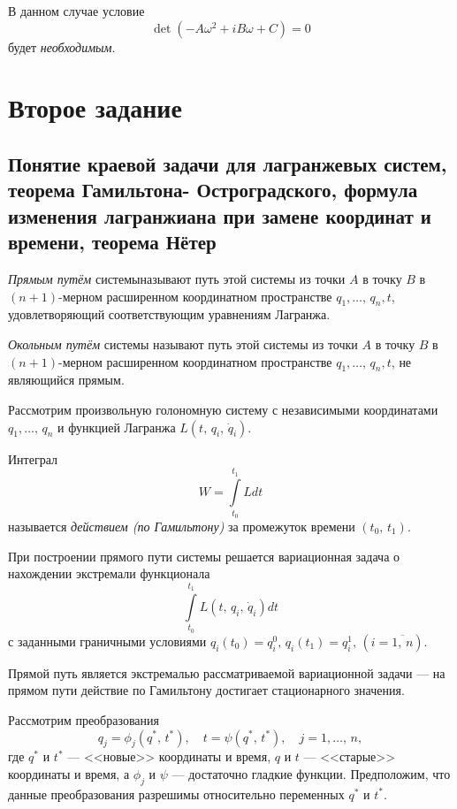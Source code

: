 \documentclass[a4paper]{article}
\begin{document}
В данном случае условие
\[
	\det (-A \omega^2 +i B\omega+C)=0
\] 
будет  \emph{необходимым}.
\section{Второе задание}
\subsection{Понятие краевой задачи для лагранжевых систем, теорема Гамильтона-
Остроградского, формула изменения лагранжиана при замене координат и
времени, теорема Нётер}
\begin{dfn}
	\emph{Прямым путём} системыназывают путь этой системы из точки $A$ в
	точку  $B$ в $(n+1)$-мерном расширенном координатном пространстве
	$q_1,\ldots,\,q_n,t$, удовлетворяющий соответствующим уравнениям
	Лагранжа.
\end{dfn}
\begin{dfn}
	\emph{Окольным путём} системы называют путь этой системы из точки $A$ в
	точку  $B$ в $(n+1)$-мерном расширенном координатном пространстве
	$q_1,\ldots,\,q_n,t$, не являющийся прямым.
\end{dfn}
Рассмотрим произвольную голономную систему с независимыми координатами
$q_1,\ldots,\,q_n$ и функцией Лагранжа $L\left(t,\,q_i,\,\dot{q}_i\right)$.
\begin{dfn}
	Интеграл
	\[
	W=\int\limits_{t_0}^{t_1} L dt 
	\] 
	называется \emph{действием (по Гамильтону)} за промежуток времени
	$(t_0,\,t_1)$.
\end{dfn}
При построении прямого пути системы решается вариационная задача о нахождении
экстремали функционала
\[
	\int\limits_{t_0}^{t_1} L\left( t,\,q_i,\,\dot{q}_i \right) dt
\] с заданными граничными условиями $q_i(t_0)=q_i^0,\,
q_i(t_1)=q_i^1,\, \left( i=\overline{1,\,n} \right) $.
\begin{thm}
	Прямой путь является экстремалью рассматриваемой вариационной задачи
	--- на прямом пути действие по Гамильтону достигает стационарного
	значения.
\end{thm}
Рассмотрим преобразования
\[
	q_j=\phi_j(q^*,\,t^*),\quad t=\psi(q^*,\,t^*), \quad j=1,\ldots,\,n,
\] 
где $q^*$ и $t^*$ ---  <<новые>> координаты и время, $q$ и $t$ --- <<старые>>
координаты и время, а $\phi_j$ и $\psi$ --- достаточно гладкие функции.
Предположим, что данные преобразования разрешимы относительно переменных
$q^*$ и  $t^*$.
\end{document}
